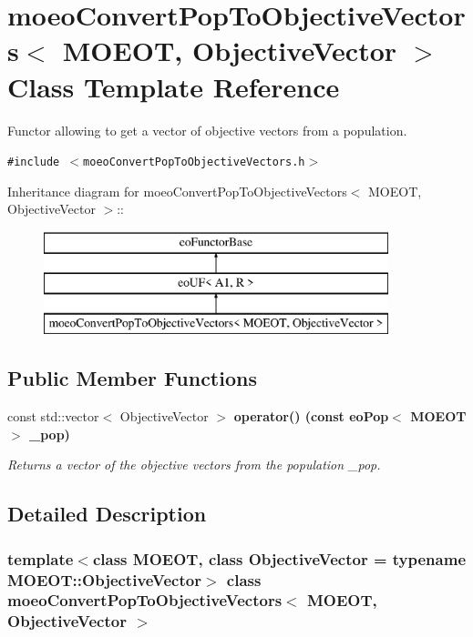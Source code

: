 \section{moeo\-Convert\-Pop\-To\-Objective\-Vectors$<$ MOEOT, Objective\-Vector $>$ Class Template Reference}
\label{classmoeoConvertPopToObjectiveVectors}
Functor allowing to get a vector of objective vectors from a population.  


{\tt \#include $<$moeo\-Convert\-Pop\-To\-Objective\-Vectors.h$>$}

Inheritance diagram for moeo\-Convert\-Pop\-To\-Objective\-Vectors$<$ MOEOT, Objective\-Vector $>$::\begin{figure}[H]
\begin{center}
\leavevmode
\includegraphics[height=3cm]{classmoeoConvertPopToObjectiveVectors}
\end{center}
\end{figure}
\subsection*{Public Member Functions}
\begin{CompactItemize}
\item 
const std::vector$<$ Objective\-Vector $>$ \bf{operator()} (const \bf{eo\-Pop}$<$ MOEOT $>$ \_\-pop)
\begin{CompactList}\small\item\em Returns a vector of the objective vectors from the population \_\-pop. \item\end{CompactList}\end{CompactItemize}


\subsection{Detailed Description}
\subsubsection*{template$<$class MOEOT, class Objective\-Vector = typename MOEOT::Objective\-Vector$>$ class moeo\-Convert\-Pop\-To\-Objective\-Vectors$<$ MOEOT, Objective\-Vector $>$}

